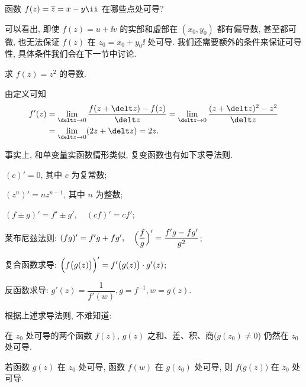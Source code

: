\begin{exercise}
  函数 $f(z)=\ov z=x-y\ii$ 在哪些点处可导? 
\end{exercise}

可以看出, 即使 $f(z)=u+\ii v$ 的实部和虚部在 $(x_0,y_0)$ 都有偏导数, 甚至都可微, 也无法保证 $f(z)$ 在 $z_0=x_0+y_0\ii$ 处可导.
我们还需要额外的条件来保证可导性, 具体条件我们会在下一节中讨论.

\begin{example}
  求 $f(z)=z^2$ 的导数.
\end{example}

\begin{solution}
  由定义可知
  \begin{align*}
     f'(z)&
    =\lim_{\delt z\ra 0}\frac{f(z+\delt z)-f(z)}{\delt z}
    =\lim_{\delt z\ra 0}\frac{(z+\delt z)^2-z^2}{\delt z}\\&
    =\lim_{\delt z\ra 0}(2z+\delt z)=2z.
  \end{align*}
\end{solution}

事实上, 和单变量实函数情形类似, 复变函数也有如下求导法则.
\begin{theorem}
  \begin{enuma}
    \item $(c)'=0$, 其中 $c$ 为复常数;
    \item $(z^n)'=nz^{n-1}$, 其中 $n$ 为整数;
    \item $(f\pm g)'=f'\pm g',\quad (cf)'=cf'$;
    \item 莱布尼兹法则: $(fg)'=f'g+fg',\quad \Bigl(\dfrac fg\Bigr)'=\dfrac{f'g-fg'}{g^2}$;
    \item 复合函数求导: $\Bigl(f\bigl(g(z)\bigr)\Bigr)'=f'\bigl(g(z)\bigr)\cdot g'(z)$;
    \item 反函数求导: $g'(z)=\dfrac1{f'(w)}, g=f^{-1}, w=g(z)$.
    \label{item:inverse-function-derivative}
  \end{enuma}
\end{theorem}

根据上述求导法则, 不难知道:

\begin{theorem}
  \label{thm:four-derivable}
  \begin{enuma}
    \item 在 $z_0$ 处可导的两个函数 $f(z)$, $g(z)$ 之和、差、积、商($g(z_0)\neq 0$) 仍然在 $z_0$ 处可导.
    \item 若函数 $g(z)$ 在 $z_0$ 处可导, 函数 $f(w)$ 在 $g(z_0)$ 处可导, 则 $f\bigl(g(z)\bigr)$ 在 $z_0$ 处可导.
  \end{enuma}
\end{theorem}

